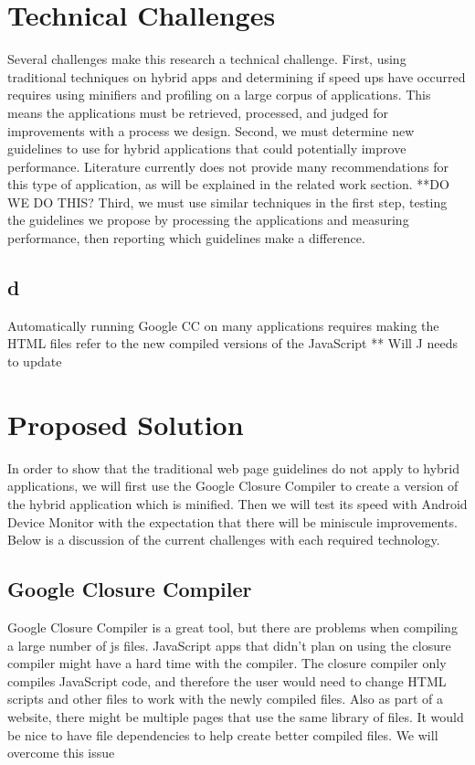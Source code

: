 \documentclass{acm_proc_article-sp}
\begin{document}
\section{Technical Challenges}
Several challenges make this research a technical challenge. First, using traditional techniques on hybrid apps and determining if speed ups have occurred requires using minifiers and profiling on a large corpus of applications. This means the applications must be retrieved, processed, and judged for improvements with a process we design. Second, we must determine new guidelines to use for hybrid applications that could potentially improve performance. Literature currently does not provide many recommendations for this type of application, as will be explained in the related work section. **DO WE DO THIS? Third, we must use similar techniques in the first step, testing the guidelines we propose by processing the applications and measuring performance, then reporting which guidelines make a difference.

\subsection{d}
Automatically running Google CC on many applications requires making the HTML files refer to the new compiled versions of the JavaScript  ** Will J needs to update

\section{Proposed Solution}
In order to show that the traditional web page guidelines do not apply to hybrid applications, we will first use the Google Closure Compiler to create a version of the hybrid application which is minified. Then we will test its speed with Android Device Monitor with the expectation that there will be miniscule improvements. Below is a discussion of the current challenges with each required technology.


\subsection{Google Closure Compiler}
Google Closure Compiler is a great tool, but there are problems when compiling a large number of js files. JavaScript apps that didn’t plan on using the closure compiler might have a hard time with the compiler. The closure compiler only compiles JavaScript code, and therefore the user would need to change HTML scripts and other files to work with the newly compiled files. Also as part of a website, there might be multiple pages that use the same library of files. It would be nice to have file dependencies to help create better compiled files. We will overcome this issue 
\end{document}
